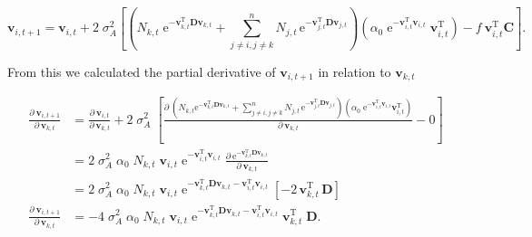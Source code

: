 \begin{equation*}
    \mathbf{v}_{i,t+1} = \mathbf{v}_{i,t} + 2 \; \sigma_A^2
    \left[
        \left(
            N_{k,t} \; \textrm{e}^{ -\mathbf{v}_{k,t}^{\textrm{T}} \mathbf{D}
            \mathbf{v}_{k,t} } + 
            \sum_{j \ne i, j \ne k}^{n}{ N_{j,t} \, \textrm{e}^{
                - \mathbf{v}_{j,t}^{\textrm{T}}
                \mathbf{D} \mathbf{v}_{j,t} } }
        \right)
        \left(
            \alpha_0 \; \textrm{e}^{-\mathbf{v}_{i,t}^{\textrm{T}}
            \mathbf{v}_{i,t} } \; \mathbf{v}_{i,t}^{\textrm{T}}
        \right)
        - f \: \mathbf{v}_{i,t}^{\textrm{T}} \mathbf{C}
    \right]
    \textrm{.}
\end{equation*}

From this we calculated the partial derivative of $\mathbf{v}_{i,t+1}$ in relation to
$\mathbf{v}_{k,t}$


\begin{equation*}
\begin{split}
    \frac{ \partial \: \mathbf{v}_{i,t+1} }{ \partial \: \mathbf{v}_{k,t} } &=
        \frac{ \partial \: \mathbf{v}_{i,t} }{ \partial \: \mathbf{v}_{k,t} } +
        2 \; \sigma_A^2 \;
        \left[
            \frac{ \partial \:
                \left(
                    N_{k,t} \textrm{e}^{- \mathbf{v}_{k,t}^{\textrm{T}} \mathbf{D}
                    \mathbf{v}_{k,t}} + 
                    \sum_{j \ne i, j \ne k}^{n}{ N_{j,t} \, \textrm{e}^{
                        - \mathbf{v}_{j,t}^{\textrm{T}}
                        \mathbf{D} \mathbf{v}_{j,t} } }
                \right)
                \left(
                    \alpha_0 \; \textrm{e}^{ - \mathbf{v}_{i,t}^{\textrm{T}}
                    \mathbf{v}_{i,t} } \mathbf{v}_{i,t}^{\textrm{T}}
                \right)
            }{ \partial \:  \mathbf{v}_{k,t} } -
            0
        \right] \\
    &= 2 \; \sigma_A^2 \; \alpha_0 \; N_{k,t} \; \mathbf{v}_{i,t} \;
        \textrm{e}^{ - \mathbf{v}_{i,t}^{\textrm{T}}
        \mathbf{v}_{i,t} } \; 
        \frac{ \partial \:
                \textrm{e}^{
                    - \mathbf{v}_{k,t}^{\textrm{T}} \mathbf{D} \mathbf{v}_{k,t}
                    }
            }{ \partial \:  \mathbf{v}_{k,t} } \\
    &= 2 \; \sigma_A^2 \; \alpha_0 \; N_{k,t} \; \mathbf{v}_{i,t} \;
        \textrm{e}^{
                    - \mathbf{v}_{k,t}^{\textrm{T}} \mathbf{D} \mathbf{v}_{k,t}
                    - \mathbf{v}_{i,t}^{\textrm{T}} \mathbf{v}_{i,t}
                } \;
        \left[ 
            - 2 \, \mathbf{v}_{k,t}^{\textrm{T}} \, \mathbf{D}
        \right] \\
    \frac{ \partial \: \mathbf{v}_{i,t+1} }{ \partial \: \mathbf{v}_{k,t}} &=
        -4 \; \sigma_A^2 \; \alpha_0 \; N_{k,t} \; \mathbf{v}_{i,t} \;
        \textrm{e}^{
                    - \mathbf{v}_{k,t}^{\textrm{T}} \mathbf{D} \mathbf{v}_{k,t}
                    - \mathbf{v}_{i,t}^{\textrm{T}} \mathbf{v}_{i,t}
                } \;
        \mathbf{v}_{k,t}^{\textrm{T}} \; \mathbf{D}
    \textrm{.} \\
\end{split}
\end{equation*}

